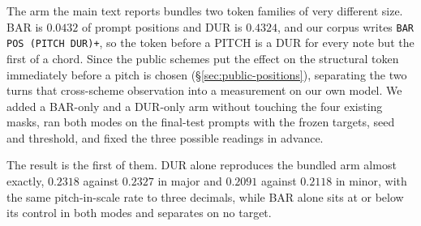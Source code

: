 \documentclass{article}
\begin{document}
%
The arm the main text reports bundles two token families of very different size.
BAR is $0.0432$ of prompt positions and DUR is $0.4324$, and our corpus writes
\texttt{BAR POS (PITCH DUR)+}, so the token before a PITCH is a DUR for every note
but the first of a chord. Since the public schemes put the effect on the structural
token immediately before a pitch is chosen (\S\ref{sec:public-positions}), separating
the two turns that cross-scheme observation into a measurement on our own model. We
added a BAR-only and a DUR-only arm without touching the four existing masks, ran
both modes on the final-test prompts with the frozen targets, seed and threshold, and
fixed the three possible readings in advance.

The result is the first of them. DUR alone reproduces the bundled arm almost exactly,
$0.2318$ against $0.2327$ in major and $0.2091$ against $0.2118$ in minor, with the
same pitch-in-scale rate to three decimals, while BAR alone sits at or below its control in
both modes and separates on no target.
\end{document}

